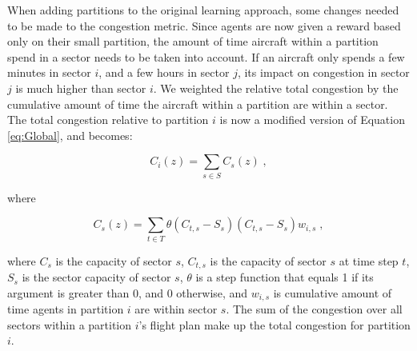 \documentclass[onehalf,11pt]{beavtex}
\begin{document}
When adding partitions to the original learning approach, some changes needed to be made to the congestion metric. Since agents are now given a reward based only on their small partition, the amount of time aircraft within a partition spend in a sector needs to be taken into account. If an aircraft only spends a few minutes in sector $i$, and a few hours in sector $j$, its impact on congestion in sector $j$ is much higher than sector $i$. We weighted the relative total congestion by the cumulative amount of time the aircraft within a partition are within a sector. The total congestion relative to partition $i$ is now a modified version of Equation \ref{eq:Global}, and becomes:

\begin{equation}
C_i(z) = \displaystyle\sum\limits_{s \in S} C_s(z)\;,
\end{equation}

where

\begin{equation}
C_s(z) = \displaystyle\sum\limits_{t \in T} \theta(C_{t,s} - S_s) (C_{t,s} - S_s) w_{i,s}\;,
\end{equation}

where $C_s$ is the capacity of sector $s$, $C_{t,s}$ is the capacity of sector $s$ at time step $t$, $S_s$ is the sector capacity of sector $s$, $\theta$ is a step function that equals 1 if its argument is greater than 0, and 0 otherwise, and $w_{i,s}$ is cumulative amount of time agents in partition $i$ are within sector $s$. The sum of the congestion over all sectors within a partition $i$'s flight plan make up the total congestion for partition $i$.
\end{document}
